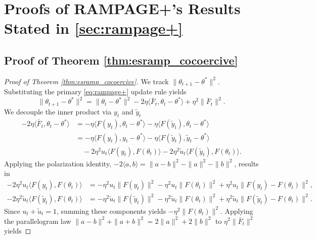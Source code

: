 \documentclass[letter,11pt]{article}
\begin{document}
\section{Proofs of RAMPAGE+'s Results Stated in \ref{sec:rampage+}}
\subsection{Proof of Theorem \ref{thm:esramp_cocoercive}}\label{sec:esramp_cocoercive}
\begin{proof}[Proof of Theorem \ref{thm:esramp_cocoercive}]
We track $\|\theta_{t+1} - \theta^*\|^2$. Substituting the primary \eqref{eq:rampage+} update rule yields
\begin{equation} \label{eq:esramp_base_expansion}
\|\theta_{t+1} - \theta^*\|^2 = \|\theta_t - \theta^*\|^2 - 2\eta \langle \bar{F}_t, \theta_t - \theta^* \rangle + \eta^2 \|\bar{F}_t\|^2.
\end{equation}
We decouple the inner product via $y_t$ and $\tilde{y}_t$
\begin{equation}
\begin{aligned}
-2\eta \langle \bar{F}_t, \theta_t - \theta^* \rangle &= -\eta \langle F(y_t), \theta_t - \theta^* \rangle - \eta \langle F(\tilde{y}_t), \theta_t - \theta^* \rangle \\
&= -\eta \langle F(y_t), y_t - \theta^* \rangle - \eta \langle F(\tilde{y}_t), \tilde{y}_t - \theta^* \rangle \\
&\quad - 2\eta^2 u_t \langle F(y_t), F(\theta_t) \rangle - 2\eta^2 \tilde{u}_t \langle F(\tilde{y}_t), F(\theta_t) \rangle.
\end{aligned}
\end{equation}
Applying the polarization identity, $-2\langle a, b \rangle = \|a-b\|^2 - \|a\|^2 - \|b\|^2$, results in
\begin{equation}
\begin{aligned}
- 2\eta^2 u_t \langle F(y_t), F(\theta_t) \rangle &= -\eta^2 u_t \|F(y_t)\|^2 - \eta^2 u_t \|F(\theta_t)\|^2 + \eta^2 u_t \|F(y_t) - F(\theta_t)\|^2, \\
- 2\eta^2 \tilde{u}_t \langle F(\tilde{y}_t), F(\theta_t) \rangle &= -\eta^2 \tilde{u}_t \|F(\tilde{y}_t)\|^2 - \eta^2 \tilde{u}_t \|F(\theta_t)\|^2 + \eta^2 \tilde{u}_t \|F(\tilde{y}_t) - F(\theta_t)\|^2.
\end{aligned}
\end{equation}
Since $u_t + \tilde{u}_t = 1$, summing these components yields $-\eta^2 \|F(\theta_t)\|^2$. Applying the parallelogram law $\|a-b\|^2+\|a+b\|^2 = 2 \|a\|^2 + 2 \|b\|^2$ to $\eta^2 \|\bar{F}_t\|^2$ yields

\end{proof}
\end{document}
